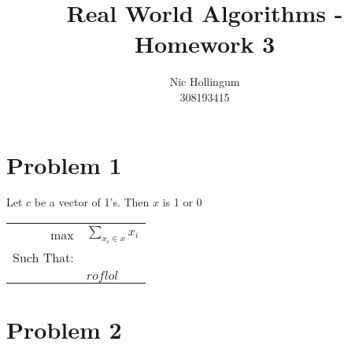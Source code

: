 
\author{	Nic Hollingum\\
			308193415}
\title{Real World Algorithms - Homework 3}

\addtolength{\oddsidemargin}{-.875in}
\addtolength{\evensidemargin}{-.875in}
\addtolength{\textwidth}{1.75in}
\addtolength{\topmargin}{-.875in}
\addtolength{\textheight}{1.75in}


\maketitle

\section {Problem 1}
Let $c$ be a vector of 1's.
Then $x$ is 1 or 0
\begin{tabular}{r@{ }l}
	max&$\sum_{x_i \in x}x_i$\\
	Such That:&\\
	&$roflol$\\
\end{tabular}

\section {Problem 2}


